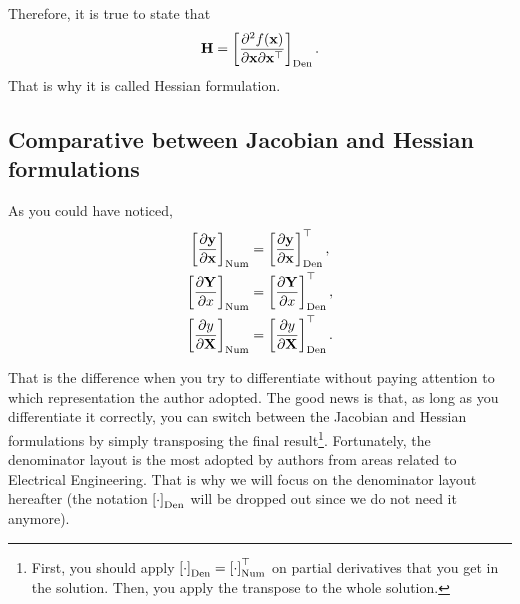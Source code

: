 \documentclass{article}
\newcommand{\trans}{\top}
\begin{document}
Therefore, it is true to state that
\begin{align}
    \mathbf{H} = \left[ \dfrac{\partial^{2} f(\mathbf{x})}{\partial \mathbf{x} \partial \mathbf{x}^\top} \right]_{\textnormal{Den}}.
\end{align}
That is why it is called Hessian formulation.

\subsection{Comparative between Jacobian and Hessian formulations}

As you could have noticed,
\begin{align}
    \left[ \dfrac{\partial \mathbf{y}}{\partial \mathbf{x}} \right]_{\textnormal{Num}} & = \left[ \dfrac{\partial \mathbf{y}}{\partial \mathbf{x}} \right]_{\textnormal{Den}}^{\trans}, \\
    \left[ \dfrac{\partial \mathbf{Y}}{\partial x}\right]_{\textnormal{Num}} & = \left[ \dfrac{\partial \mathbf{Y}}{\partial x}\right]_{\textnormal{Den}}^{\trans}, \\
    \left[\dfrac{\partial y}{\partial \mathbf{X}}\right]_{\textnormal{Num}} & = \left[\dfrac{\partial y}{\partial \mathbf{X}}\right]_{\textnormal{Den}}^{\trans}.
\end{align}

That is the difference when you try to differentiate without paying attention to which representation the author adopted. The good news is that, as long as you differentiate it correctly, you can switch between the Jacobian and Hessian formulations by simply transposing the final result\footnote{First, you should apply \(\left[\cdot\right]_{\textnormal{Den}} = \left[\cdot\right]_{\textnormal{Num}}^{\trans}\) on partial derivatives that you get in the solution. Then, you apply the transpose to the whole solution.}. Fortunately, the denominator layout is the most adopted by authors from areas related to Electrical Engineering. That is why we will focus on the denominator layout hereafter (the notation \(\left[\cdot\right]_{\textnormal{Den}}\) will be dropped out since we do not need it anymore).
\end{document}
